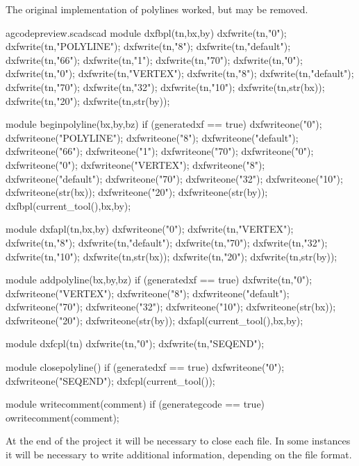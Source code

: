 \documentclass{ltxdoc}
\begin{document}
The original implementation of polylines worked, but may be removed.
 
\lstset{firstnumber=\thegcpscad}
\begin{writecode}{a}{gcodepreview.scad}{scad}
module dxfbpl(tn,bx,by) {
    dxfwrite(tn,"0");
    dxfwrite(tn,"POLYLINE");
    dxfwrite(tn,"8");
    dxfwrite(tn,"default");
    dxfwrite(tn,"66");
    dxfwrite(tn,"1");
    dxfwrite(tn,"70");
    dxfwrite(tn,"0");
    dxfwrite(tn,"0");
    dxfwrite(tn,"VERTEX");
    dxfwrite(tn,"8");
    dxfwrite(tn,"default");
    dxfwrite(tn,"70");
    dxfwrite(tn,"32");
    dxfwrite(tn,"10");
    dxfwrite(tn,str(bx));
    dxfwrite(tn,"20");
    dxfwrite(tn,str(by));
}

module beginpolyline(bx,by,bz) {
if (generatedxf == true) {
    dxfwriteone("0");
    dxfwriteone("POLYLINE");
    dxfwriteone("8");
    dxfwriteone("default");
    dxfwriteone("66");
    dxfwriteone("1");
    dxfwriteone("70");
    dxfwriteone("0");
    dxfwriteone("0");
    dxfwriteone("VERTEX");
    dxfwriteone("8");
    dxfwriteone("default");
    dxfwriteone("70");
    dxfwriteone("32");
    dxfwriteone("10");
    dxfwriteone(str(bx));
    dxfwriteone("20");
    dxfwriteone(str(by));
    dxfbpl(current_tool(),bx,by);}
}

module dxfapl(tn,bx,by) {
    dxfwriteone("0");
    dxfwrite(tn,"VERTEX");
    dxfwrite(tn,"8");
    dxfwrite(tn,"default");
    dxfwrite(tn,"70");
    dxfwrite(tn,"32");
    dxfwrite(tn,"10");
    dxfwrite(tn,str(bx));
    dxfwrite(tn,"20");
    dxfwrite(tn,str(by));
}

module addpolyline(bx,by,bz) {
if (generatedxf == true) {
    dxfwrite(tn,"0");
    dxfwriteone("VERTEX");
    dxfwriteone("8");
    dxfwriteone("default");
    dxfwriteone("70");
    dxfwriteone("32");
    dxfwriteone("10");
    dxfwriteone(str(bx));
    dxfwriteone("20");
    dxfwriteone(str(by));
    dxfapl(current_tool(),bx,by);
    }
}

module dxfcpl(tn) {
    dxfwrite(tn,"0");
    dxfwrite(tn,"SEQEND");
}

module closepolyline() {
  if (generatedxf == true) {
    dxfwriteone("0");
    dxfwriteone("SEQEND");
    dxfcpl(current_tool());
  }
}

module writecomment(comment) {
  if (generategcode == true) {
    owritecomment(comment);
  }
}

\end{writecode}
\addtocounter{gcpscad}{92}
 
At the end of the project it will be necessary to close each file. 
In some instances it will be necessary to write additional information,
depending on the file format.
 
\end{document}
